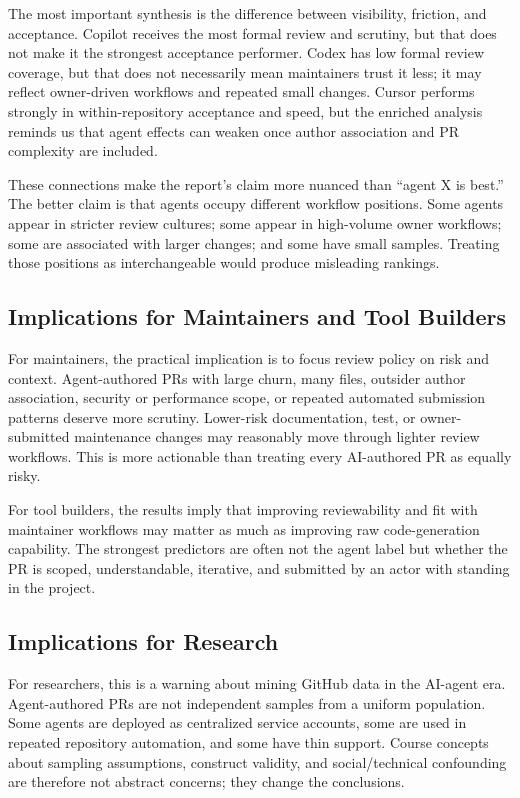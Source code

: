\documentclass[sigconf,nonacm]{acmart}
\begin{document}
The most important synthesis is the difference between visibility, friction, and acceptance. Copilot receives the most formal review and scrutiny, but that does not make it the strongest acceptance performer. Codex has low formal review coverage, but that does not necessarily mean maintainers trust it less; it may reflect owner-driven workflows and repeated small changes. Cursor performs strongly in within-repository acceptance and speed, but the enriched analysis reminds us that agent effects can weaken once author association and PR complexity are included.

These connections make the report's claim more nuanced than ``agent X is best.'' The better claim is that agents occupy different workflow positions. Some agents appear in stricter review cultures; some appear in high-volume owner workflows; some are associated with larger changes; and some have small samples. Treating those positions as interchangeable would produce misleading rankings.

\subsection{Implications for Maintainers and Tool Builders}

For maintainers, the practical implication is to focus review policy on risk and context. Agent-authored PRs with large churn, many files, outsider author association, security or performance scope, or repeated automated submission patterns deserve more scrutiny. Lower-risk documentation, test, or owner-submitted maintenance changes may reasonably move through lighter review workflows. This is more actionable than treating every AI-authored PR as equally risky.

For tool builders, the results imply that improving reviewability and fit with maintainer workflows may matter as much as improving raw code-generation capability. The strongest predictors are often not the agent label but whether the PR is scoped, understandable, iterative, and submitted by an actor with standing in the project.

\subsection{Implications for Research}

For researchers, this is a warning about mining GitHub data in the AI-agent era. Agent-authored PRs are not independent samples from a uniform population. Some agents are deployed as centralized service accounts, some are used in repeated repository automation, and some have thin support. Course concepts about sampling assumptions, construct validity, and social/technical confounding are therefore not abstract concerns; they change the conclusions.
\end{document}
